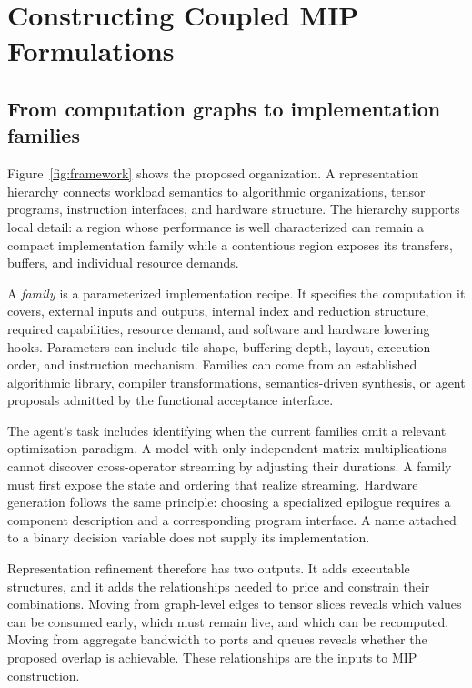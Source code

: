 \section{Constructing Coupled MIP Formulations}\label{sec:construction}
\subsection{From computation graphs to implementation families}
Figure~\ref{fig:framework} shows the proposed organization. A representation hierarchy connects workload semantics to algorithmic organizations, tensor programs, instruction interfaces, and hardware structure. The hierarchy supports local detail: a region whose performance is well characterized can remain a compact implementation family while a contentious region exposes its transfers, buffers, and individual resource demands.



A \emph{family} is a parameterized implementation recipe. It specifies the computation it covers, external inputs and outputs, internal index and reduction structure, required capabilities, resource demand, and software and hardware lowering hooks. Parameters can include tile shape, buffering depth, layout, execution order, and instruction mechanism. Families can come from an established algorithmic library, compiler transformations, semantics-driven synthesis, or agent proposals admitted by the functional acceptance interface.

The agent's task includes identifying when the current families omit a relevant optimization paradigm. A model with only independent matrix multiplications cannot discover cross-operator streaming by adjusting their durations. A family must first expose the state and ordering that realize streaming. Hardware generation follows the same principle: choosing a specialized epilogue requires a component description and a corresponding program interface. A name attached to a binary decision variable does not supply its implementation.

Representation refinement therefore has two outputs. It adds executable structures, and it adds the relationships needed to price and constrain their combinations. Moving from graph-level edges to tensor slices reveals which values can be consumed early, which must remain live, and which can be recomputed. Moving from aggregate bandwidth to ports and queues reveals whether the proposed overlap is achievable. These relationships are the inputs to MIP construction.

